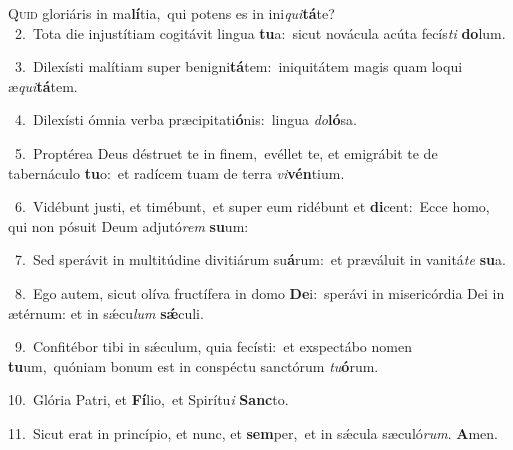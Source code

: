 \lettrine{\initial\textcolor{\initialcolor}{Q}}{uid} gloriáris in ma\-\textbf{lí}\-tia,~\star qui potens es in ini\-\textit{qui}\-\textbf{tá}te?\\
{\numbfont\textcolor{\numbcolor}{~2.}}~Tota die injustítiam cogitávit lingua \textbf{tu}\-a:~\star sicut novácula acúta fecís\textit{ti} \textbf{do}\-lum.\par
{\numbfont\textcolor{\numbcolor}{~3.}}~Dilexísti malítiam super benigni\-\textbf{tá}\-tem:~\star iniquitátem magis quam loqui æ\-\textit{qui}\-\textbf{tá}tem.\par
{\numbfont\textcolor{\numbcolor}{~4.}}~Dilexísti ómnia verba præcipitati\-\textbf{ó}\-nis:~\star lingua \textit{do}\-\textbf{ló}sa.\par
{\numbfont\textcolor{\numbcolor}{~5.}}~Proptérea Deus déstruet te in finem,~\dagger evéllet te, et emigrábit te de tabernáculo \textbf{tu}\-o:~\star et radícem tuam de terra \textit{vi}\-\textbf{vén}tium.\par
{\numbfont\textcolor{\numbcolor}{~6.}}~Vidébunt justi, et timébunt,~\dagger et super eum ridébunt et \textbf{di}\-cent:~\star Ecce homo, qui non pósuit Deum adjutó\textit{rem} \textbf{su}\-um:\par
{\numbfont\textcolor{\numbcolor}{~7.}}~Sed sperávit in multitúdine divitiárum su\-\textbf{á}\-rum:~\star et præváluit in vanitá\textit{te} \textbf{su}\-a.\par
{\numbfont\textcolor{\numbcolor}{~8.}}~Ego autem, sicut olíva fructífera in domo \textbf{De}\-i:~\star sperávi in misericórdia Dei in ætérnum: et in sǽcu\textit{lum} \textbf{sǽ}\-culi.\par
{\numbfont\textcolor{\numbcolor}{~9.}}~Confitébor tibi in sǽculum, quia fecísti:~\dagger et exspectábo nomen \textbf{tu}\-um,~\star quóniam bonum est in conspéctu sanctórum \textit{tu}\-\textbf{ó}rum.\par
{\numbfont\textcolor{\numbcolor}{10.}}~Glória Patri, et \textbf{Fí}\-lio,~\star et Spirítu\textit{i} \textbf{Sanc}\-to.\par
{\numbfont\textcolor{\numbcolor}{11.}}~Sicut erat in princípio, et nunc, et \textbf{sem}\-per,~\star et in sǽcula sæculó\-\textit{rum}\-. \textbf{A}\-men.\par
